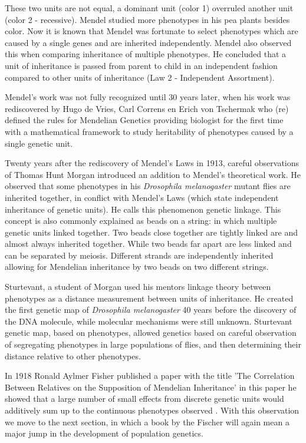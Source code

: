 These two units are not equal, a dominant unit (color 1) overruled another 
unit (color 2 - recessive). Mendel studied more phenotypes in his pea plants 
besides color. Now it is known that Mendel was fortunate to select 
phenotypes which are caused by a single genes and are inherited independently. 
Mendel also observed this when comparing inheritance of multiple phenotypes. 
He concluded that a unit of inheritance is passed from parent to child in an 
independent fashion compared to other units of inheritance 
(Law 2 - Independent Assortment).

Mendel's work was not fully recognized until 30 years later, when his work was 
rediscovered by Hugo de Vries, Carl Correns en Erich von Tschermak who (re) defined the 
rules for Mendelian Genetics \cite{deVries:1889} providing biologist for the first 
time with a mathematical framework to study heritability of phenotypes caused by a 
single genetic unit.

Twenty years after the rediscovery of Mendel's Laws in 1913, careful observations of 
Thomas Hunt Morgan introduced an addition to Mendel's theoretical work. He observed 
that some phenotypes in his \emph{Drosophila melanogaster} mutant flies are inherited 
together, in conflict with Mendel's Laws (which state independent inheritance of 
genetic units). He calls this phenomenon genetic linkage. This concept is also commonly 
explained as beads on a string: in which multiple genetic units linked together. Two beads 
close together are tightly linked are and almost always inherited together. While 
two beads far apart are less linked and can be separated by meiosis. Different 
strands are independently inherited allowing for Mendelian inheritance by two beads 
on two different strings.

Sturtevant, a student of Morgan used his mentors linkage theory between phenotypes 
as a distance measurement between units of inheritance. He created the first genetic 
map of \emph{Drosophila melanogaster} 40 years before the discovery of the DNA molecule, 
while molecular mechanisms were still unknown. Sturtevant genetic map, based on 
phenotypes, allowed genetics based on careful observation of segregating phenotypes in 
large populations of flies, and then determining their distance relative to other 
phenotypes.

In 1918 Ronald Aylmer Fisher published a paper with the title 'The Correlation Between 
Relatives on the Supposition of Mendelian Inheritance' in this paper he showed that a 
large number of small effects from discrete genetic units would additively sum up to 
the continuous phenotypes observed \cite{Fisher:1918}. With this observation we move 
to the next section, in which a book by the Fischer will again mean a major jump in 
the development of population genetics.

